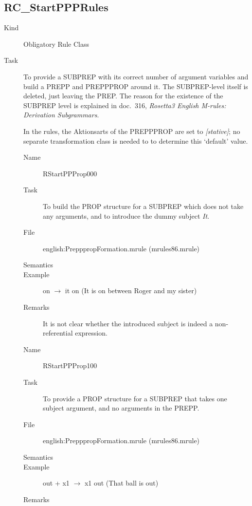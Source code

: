 \subsection{RC\_StartPPPRules}
\begin{description}
\item[Kind] Obligatory Rule Class
\item[Task] To provide a SUBPREP with its correct number of argument variables 
and build a PREPP and PREPPPROP around it. The SUBPREP-level itself is deleted, 
just leaving the PREP. The reason for the existence of the SUBPREP level is 
explained in doc.\ 316, {\em Rosetta3 English M-rules: Derivation Subgrammars}. 

In the rules, the Aktionsarts of the PREPPPROP are set to {\em [stative]\/};
no separate transformation class is needed to to determine this `default' 
value.

\vspace{1 cm}
\begin{description}
\item[Name] RStartPPProp000
\item[Task] To build the PROP structure for a SUBPREP which does not take any 
arguments, and to introduce the dummy subject {\em It\/}.
\item[File] english:PrepppropFormation.mrule (mrules86.mrule)
\item[Semantics]
\item[Example] on $\rightarrow$ it on (It is on between Roger and my sister)
\item[Remarks] It is not clear whether the introduced subject is indeed a 
non-referential expression.
\end{description}

\vspace{1 cm}
\begin{description}
\item[Name] RStartPPProp100
\item[Task] To provide a PROP structure for a SUBPREP that takes one subject 
argument, and no arguments in the PREPP.
\item[File] english:PrepppropFormation.mrule (mrules86.mrule)
\item[Semantics]
\item[Example] out + x1 $\rightarrow$ x1 out (That ball is out)
\item[Remarks]
\end{description}


\end{description}
